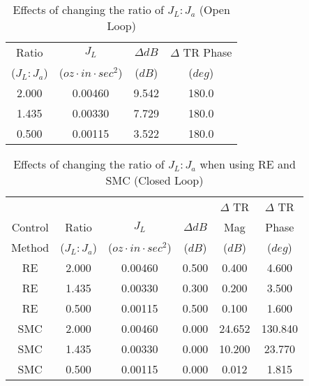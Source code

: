 


\begin{center}
	\begin{table}\label{table:resultsOpenLoop}
	\caption{Effects of changing the ratio of $J_L:J_a$ (Open Loop)}
	\begin{center}
  \begin{tabular}{  c | c | c | c }

Ratio					& $J_L$										& $\Delta dB$	& $\Delta$ TR Phase \\ 
($J_L:J_a$)		&($oz\cdot in\cdot sec^2$)& ($dB$)			& ($deg$)							\\	\hline
\hline
2.000  				&0.00460  								&9.542  			&180.0							\\	\hline
1.435  				&0.00330  								&7.729  			&180.0							\\	\hline
0.500  				&0.00115  								&3.522  			&180.0							\\

  \end{tabular}
  \end{center}
  \end{table}
\end{center}


\begin{center}
	\begin{table}\label{table:resultsClosedLoop}
	\caption{Effects of changing the ratio of $J_L:J_a$ when using RE and SMC (Closed Loop)}
	\begin{center}
  \begin{tabular}{ c | c | c | c | c | c }
						&								& 												& 								& $\Delta$ TR 		& $\Delta$ TR 			\\ 
Control			&Ratio					& $J_L$										& $\Delta dB$			& Mag 						& Phase 						\\ 
Method			&($J_L:J_a$)		&($oz\cdot in\cdot sec^2$)& ($dB$)					& ($dB$)					& ($deg$)						\\	\hline
\hline
RE 					&2.000  				&0.00460  								&0.500  					&0.400  					&4.600							\\	\hline
RE 					&1.435  				&0.00330  								&0.300  					&0.200  					&3.500							\\	\hline
RE 					&0.500  				&0.00115  								&0.500  					&0.100  					&1.600							\\	\hline
\hline
SMC 				&2.000  				&0.00460  								&0.000  					&24.652  					&130.840						\\	\hline
SMC 				&1.435  				&0.00330  								&0.000  					&10.200  					&23.770							\\	\hline
SMC 				&0.500  				&0.00115  								&0.000  					&0.012  					&1.815							\\	


  \end{tabular}
  \end{center}
  \end{table}
\end{center}